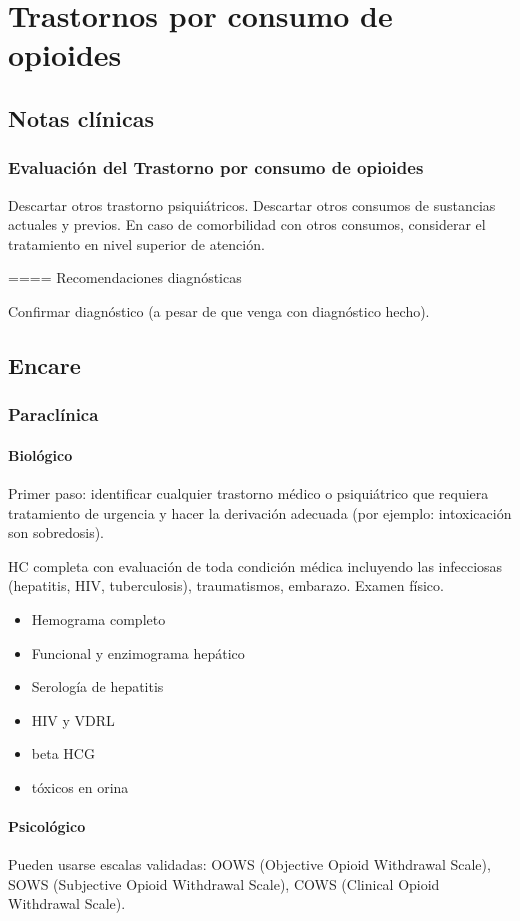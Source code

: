 \chapter{Trastornos por consumo de opioides}
\section*{Notas clínicas}
\subsection*{Evaluación del Trastorno por consumo de opioides}

Descartar otros trastorno psiquiátricos.
Descartar otros consumos de sustancias actuales y previos.
En caso de comorbilidad con otros consumos, considerar el tratamiento en nivel superior de atención.

==== Recomendaciones diagnósticas

Confirmar diagnóstico (a pesar de que venga con diagnóstico hecho).

\section*{Encare}
\subsection*{Paraclínica}
\subsubsection{Biológico}
Primer paso: identificar cualquier trastorno médico o psiquiátrico que requiera tratamiento de urgencia y hacer la derivación adecuada (por ejemplo: intoxicación son sobredosis).

HC completa con evaluación de toda condición médica incluyendo las infecciosas (hepatitis, HIV, tuberculosis), traumatismos, embarazo. Examen físico.
\begin{itemize}
	\item Hemograma completo
	\item Funcional y enzimograma hepático
	\item Serología de hepatitis
	\item HIV y VDRL
	\item beta HCG
	\item tóxicos en orina
\end{itemize}
\subsubsection{Psicológico}
Pueden usarse escalas validadas: OOWS (Objective Opioid Withdrawal Scale), SOWS (Subjective Opioid Withdrawal Scale), COWS (Clinical Opioid Withdrawal Scale).
